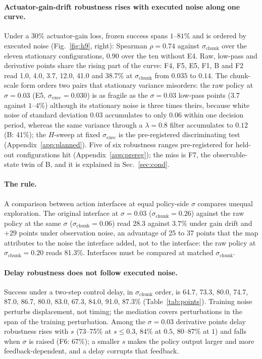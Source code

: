 \documentclass{article}
\newcommand{\sexec}{\sigma_{\mathrm{exec}}}
\newcommand{\schunk}{\sigma_{\mathrm{chunk}}}
\begin{document}
\paragraph{Actuator-gain-drift robustness rises with executed noise along one curve.} Under a 30\% actuator-gain loss, frozen success spans $1$--$81\%$ and is ordered by executed noise (Fig.~\ref{fig:h9}, right): Spearman $\rho=0.74$ against $\schunk$ over the eleven stationary configurations, $0.90$ over the ten without E4. Raw, low-pass and derivative points share the rising part of the curve: F4, F5, E5, F1, B and F2 read 1.0, 4.0, 3.7, 12.0, 41.0 and 38.7\% at $\schunk$ from $0.035$ to $0.14$. The chunk-scale form orders two pairs that stationary variance misorders: the raw policy at $\sigma=0.03$ (E5, $\sexec=0.030$) is as fragile as the $\sigma=0.03$ low-pass points ($3.7$ against $1$--$4\%$) although its stationary noise is three times theirs, because white noise of standard deviation $0.03$ accumulates to only $0.06$ within one decision period, whereas the same variance through a $\lambda=0.8$ filter accumulates to $0.12$ (B: 41\%); the $H$-sweep at fixed $\sexec$ is the pre-registered discriminating test (Appendix~\ref{app:planned}). Five of six robustness ranges pre-registered for held-out configurations hit (Appendix~\ref{app:prereg}); the miss is F7, the observable-state twin of B, and it is explained in Sec.~\ref{sec:cond}.

\paragraph{The rule.} A comparison between action interfaces at equal policy-side $\sigma$ compares unequal exploration. The original interface at $\sigma=0.03$ ($\schunk=0.26$) against the raw policy at the same $\sigma$ ($\schunk=0.06$) read $28.3$ against $3.7\%$ under gain drift and $+29$ points under observation noise, an advantage of 25 to 37 points that the map attributes to the noise the interface added, not to the interface: the raw policy at $\schunk=0.20$ reads 81.3\%. Interfaces must be compared at matched $\schunk$.

\paragraph{Delay robustness does not follow executed noise.} Success under a two-step control delay, in $\schunk$ order, is 64.7, 73.3, 80.0, 74.7, 87.0, 86.7, 80.0, 83.0, 67.3, 84.0, 91.0, 87.3\% (Table~\ref{tab:points}). Training noise perturbs displacement, not timing; the mediation covers perturbations in the span of the training perturbation. Among the $\sigma=0.03$ derivative points delay robustness rises with $s$ (73--75\% at $s\le0.3$, 84\% at $0.5$, 80--87\% at $1$) and falls when $\sigma$ is raised (F6: 67\%); a smaller $s$ makes the policy output larger and more feedback-dependent, and a delay corrupts that feedback.
\end{document}
